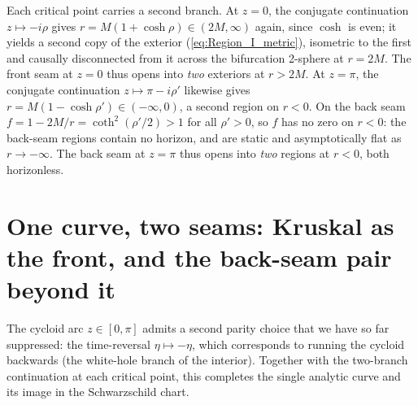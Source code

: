 \documentclass[11pt,a4paper]{article}
\theoremstyle{definition}
\begin{document}
Each critical point carries a second branch. At $z=0$, the conjugate continuation $z \mapsto -i\rho$ gives $r = M(1+\cosh\rho) \in (2M,\infty)$ again, since $\cosh$ is even; it yields a second copy of the exterior (\ref{eq:Region_I_metric}), isometric to the first and causally disconnected from it across the bifurcation 2-sphere at $r=2M$. The front seam at $z=0$ thus opens into \emph{two} exteriors at $r>2M$. At $z=\pi$, the conjugate continuation $z \mapsto \pi - i\rho'$ likewise gives $r = M(1-\cosh\rho') \in (-\infty,0)$, a second region on $r<0$. On the back seam $f = 1 - 2M/r = \coth^2(\rho'/2) > 1$ for all $\rho'>0$, so $f$ has no zero on $r<0$: the back-seam regions contain no horizon, and are static and asymptotically flat as $r \to -\infty$. The back seam at $z=\pi$ thus opens into \emph{two} regions at $r<0$, both horizonless.

\section{One curve, two seams: Kruskal as the front, and the back-seam pair beyond it}\label{sec:four_regions}

The cycloid arc $z \in [0, \pi]$ admits a second parity choice that we have so far suppressed: the time-reversal $\eta \mapsto -\eta$, which corresponds to running the cycloid backwards (the white-hole branch of the interior). Together with the two-branch continuation at each critical point, this completes the single analytic curve and its image in the Schwarzschild chart.
\end{document}
